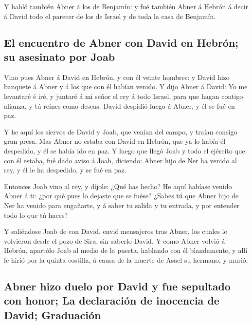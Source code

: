  Y habló también Abner á los de Benjamín: y fué también
Abner á Hebrón á decir á David todo el parecer de los de Israel y de
toda la casa de Benjamín.

\hypertarget{el-encuentro-de-abner-con-david-en-hebruxf3n-su-asesinato-por-joab}{%
\subsection{El encuentro de Abner con David en Hebrón; su asesinato por
Joab}\label{el-encuentro-de-abner-con-david-en-hebruxf3n-su-asesinato-por-joab}}

 Vino pues Abner á David en Hebrón, y con él veinte
hombres: y David hizo banquete á Abner y á los que con él habían venido.
 Y dijo Abner á David: Yo me levantaré é iré, y juntaré á
mi señor el rey á todo Israel, para que hagan contigo alianza, y tú
reines como deseas. David despidió luego á Abner, y él se fué en paz.

 Y he aquí los siervos de David y Joab, que venían del
campo, y traían consigo gran presa. Mas Abner no estaba con David en
Hebrón, que ya lo había él despedido, y él se había ido en paz.
 Y luego que llegó Joab y todo el ejército que con él
estaba, fué dado aviso á Joab, diciendo: Abner hijo de Ner ha venido al
rey, y él le ha despedido, y se fué en paz.

 Entonces Joab vino al rey, y díjole: ¿Qué has hecho? He
aquí habíase venido Abner á ti: ¿por qué pues lo dejaste que se fuése?
 ¿Sabes tú que Abner hijo de Ner ha venido para
engañarte, y á saber tu salida y tu entrada, y por entender todo lo que
tú haces?

 Y saliéndose Joab de con David, envió mensajeros tras
Abner, los cuales le volvieron desde el pozo de Sira, sin saberlo David.
 Y como Abner volvió á Hebrón, apartólo Joab al medio de
la puerta, hablando con él blandamente, y allí le hirió por la quinta
costilla, á causa de la muerte de Asael su hermano, y murió.

\hypertarget{abner-hizo-duelo-por-david-y-fue-sepultado-con-honor-la-declaraciuxf3n-de-inocencia-de-david-graduaciuxf3n}{%
\subsection{Abner hizo duelo por David y fue sepultado con honor; La
declaración de inocencia de David;
Graduación}\label{abner-hizo-duelo-por-david-y-fue-sepultado-con-honor-la-declaraciuxf3n-de-inocencia-de-david-graduaciuxf3n}}

